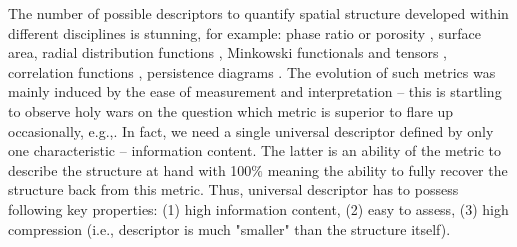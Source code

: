 \documentclass[reprint,amsmath,amssymb,aps,pre,showkeys,showpacs]{revtex4-1}
\begin{document}
The number of possible descriptors to quantify spatial structure developed
within different disciplines is stunning, for example: phase ratio or porosity
\cite{anovitz2015characterization}, surface area, radial distribution functions
\cite{zimm1948scattering,becker2010radial}, Minkowski functionals
\cite{vogel2010} and tensors \cite{schroder2011minkowski}, correlation functions
\cite{Torquato_book}, persistence diagrams
\cite{shivashankar2015felix,saadatfar2017pore,obayashi2018persistence}. The
evolution of such metrics was mainly induced by the ease of measurement and
interpretation -- this is startling to observe holy wars on the question which
metric is superior to flare up occasionally,
e.g.,\cite{vogel2022holistic,yudina2023dual}. In fact, we need a single
universal descriptor defined by only one characteristic -- information
content. The latter is an ability of the metric to describe the structure at
hand with 100$\%$ meaning the ability to fully recover the structure back from
this metric. Thus, universal descriptor has to possess following key properties:
(1) high information content, (2) easy to assess, (3) high compression (i.e.,
descriptor is much "smaller" than the structure itself).
\end{document}
